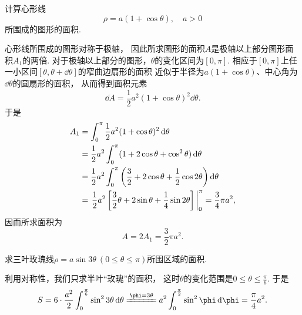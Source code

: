 \begin{example}
计算心形线\[
	\rho = a (1 + \cos\theta), \quad a>0
\]所围成的图形的面积.
\begin{solution}
心形线所围成的图形对称于极轴，
因此所求图形的面积\(A\)是极轴以上部分图形面积\(A_1\)的两倍.
对于极轴以上部分的图形，\(\theta\)的变化区间为\([0,\pi]\).
相应于\([0,\pi]\)上任一小区间\([\theta,\theta+\dd{\theta}]\)的窄曲边扇形的面积
近似于半径为\(a (1 + \cos\theta)\)、中心角为\(\dd{\theta}\)的圆扇形的面积，
从而得到面积元素\[
	\dd{A} = \frac12 a^2 (1 + \cos\theta)^2 \dd{\theta}.
\]
于是\begin{align*}
	A_1 &= \int_0^\pi \frac12 a^2 (1 + \cos\theta)^2 \dd{\theta} \\
	&= \frac12 a^2 \int_0^\pi (1 + 2\cos\theta + \cos^2\theta) \dd{\theta} \\
	&= \frac12 a^2 \int_0^\pi \left(\frac32 + 2 \cos\theta + \frac12 \cos2\theta\right) \dd{\theta} \\
	&= \eval{\frac12 a^2 \left[\frac32 \theta + 2 \sin\theta + \frac14 \sin2\theta\right]}_0^\pi
	= \frac34 \pi a^2,
\end{align*}
因而所求面积为\[
	A = 2 A_1 = \frac32 \pi a^2.
\]
\end{solution}
\end{example}

\begin{example}
求三叶玫瑰线\(\rho = a \sin3\theta\ (0 \leq \theta \leq \pi)\)所围区域的面积.
\begin{solution}
利用对称性，我们只求半叶“玫瑰”的面积，
这时\(\theta\)的变化范围是\(0 \leq \theta \leq \frac\pi6\).
于是\[
	S = 6 \cdot \frac{a^2}2 \int_0^{\frac\pi6} \sin^23\theta \dd{\theta}
	\xlongequal{\phi=3\theta} a^2 \int_0^{\frac\pi2} \sin^2\phi \dd{\phi}
	= \frac\pi4 a^2.
\]
\end{solution}
\end{example}

